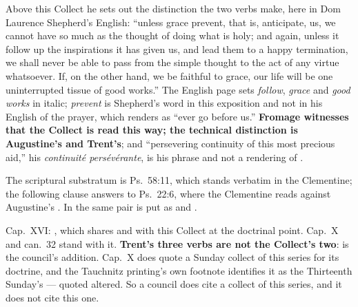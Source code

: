 \begin{witnessnote}
Above this Collect he sets out the distinction the two verbs make, here in Dom
Laurence Shepherd's English: ``unless grace prevent, that is, anticipate, us, we cannot have so
much as the thought of doing what is holy; and again, unless it follow up the
inspirations it has given us, and lead them to a happy termination, we shall
never be able to pass from the simple thought to the act of any virtue
whatsoever. If, on the other hand, we be faithful to grace, our life will be one
uninterrupted tissue of good works.'' The English page sets \emph{follow},
\emph{grace} and \emph{good works} in italic; \emph{prevent} is Shepherd's word
in this exposition and not in his English of the prayer, which renders
 as ``ever go before us.''
\textbf{Fromage witnesses that the Collect is read this way; the technical
distinction is Augustine's and Trent's}; and
``persevering continuity of this most precious aid,'' his \emph{continuité
persévérante}, is his phrase and not a rendering of .
\end{witnessnote}

\begin{witnessnote}
  The scriptural substratum is Ps.~58:11, which stands verbatim in the
Clementine; the following clause answers to Ps.~22:6, where the Clementine reads
 against Augustine's . In
 the same pair is put as  and
.
\end{witnessnote}

\begin{witnessnote}
 Cap.~XVI: , which shares
 and  with this Collect at the doctrinal point.
Cap.~X and can.~32 stand with it. \textbf{Trent's three verbs are not the
Collect's two}:  is the council's addition. Cap.~X does quote a
Sunday collect of this series for its doctrine, and the Tauchnitz printing's own
footnote identifies it as the Thirteenth Sunday's --- quoted altered. So a
council does cite a collect of this series, and it does not cite this one.
\end{witnessnote}

